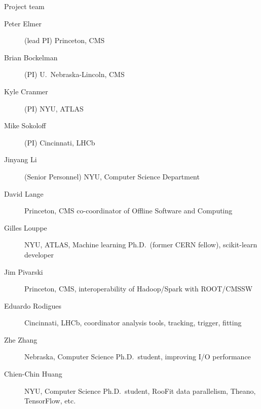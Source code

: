 \documentclass{beamer}
\begin{document}

\begin{frame}{Project team}
\scriptsize
\begin{description}
\item[Peter Elmer] (lead PI) Princeton, CMS
\item[Brian Bockelman] (PI) U.\ Nebraska-Lincoln, CMS
\item[Kyle Cranmer] (PI) NYU, ATLAS
\item[Mike Sokoloff] (PI) Cincinnati, LHCb
\item[Jinyang Li] (Senior Personnel) NYU, Computer Science Department
\item[David Lange] Princeton, CMS co-coordinator of Offline Software and Computing
\item[Gilles Louppe] NYU, ATLAS, Machine learning Ph.D.\ (former CERN fellow), scikit-learn developer
\item[Jim Pivarski] Princeton, CMS, interoperability of Hadoop/Spark with ROOT/CMSSW
\item[Eduardo Rodigues] Cincinnati, LHCb, coordinator analysis tools, tracking, trigger, fitting
\item[Zhe Zhang] Nebraska, Computer Science Ph.D.\ student, improving I/O performance
\item[Chien-Chin Huang] NYU, Computer Science Ph.D.\ student, RooFit data parallelism, Theano, TensorFlow, etc.
\end{description}
\end{frame}
\end{document}
